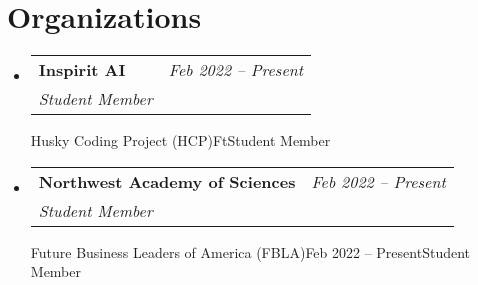 \documentclass[letterpaper,11pt]{article}
\makeatletter
\newcommand{\resumeOrganizationHeading}[4]{
  \vspace{-2pt}\item
    \begin{tabular*}{0.97\textwidth}[t]{l@{\extracolsep{\fill}}r}
      \textbf{#1} & \textit{\small #2} \\
      \textit{\small#3}
    \end{tabular*}\vspace{-7pt}
}
\newcommand{\resumeSubHeadingListStart}{\begin{itemize}[leftmargin=0.15in, label={}]}
\newcommand{\resumeSubHeadingListEnd}{\end{itemize}}
\makeatother
\begin{document}
 \section{Organizations}
 \resumeSubHeadingListStart
  
   \resumeOrganizationHeading
     {Inspirit AI}{Feb 2022 -- Present}{Student Member}
    
     \resumeOrganizationHeading
     {Husky Coding Project (HCP)}{Ft}{Student Member}

     \resumeOrganizationHeading
     {Northwest Academy of Sciences}{Feb 2022 -- Present}{Student Member}

     \resumeOrganizationHeading
     {Future Business Leaders of America (FBLA)}{Feb 2022 -- Present}{Student Member}

     

  
 \resumeSubHeadingListEnd





        




    
\end{document}
